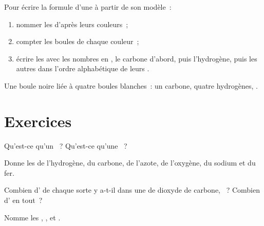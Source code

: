 \begin{method}\label{met:g7:atoms-and-molecules:model}
Pour écrire la formule d'une  à partir de son modèle~:
\begin{enumerate}
  \item nommer les  d'après leurs couleurs~;
  \item compter les boules de chaque couleur~;
  \item écrire les  avec les nombres en , le carbone
        d'abord, puis l'hydrogène, puis les autres  dans l'ordre
        alphabétique de leurs .
\end{enumerate}
Une boule noire liée à quatre boules blanches~: un carbone, quatre
hydrogènes, .
\end{method}

\section{Exercices}

\begin{exercise}[$\star$]\label{exo:g7:atoms-and-molecules:1}
Qu'est-ce qu'un ~? Qu'est-ce qu'une ~?
\end{exercise}

\begin{exercise}[$\star$]\label{exo:g7:atoms-and-molecules:2}
Donne les  de l'hydrogène, du carbone, de l'azote, de
l'oxygène, du sodium et du fer.
\end{exercise}

\begin{exercise}[$\star$]\label{exo:g7:atoms-and-molecules:3}
Combien d' de chaque sorte y a-t-il dans une  de dioxyde
de carbone, ~? Combien d' en tout~?
\end{exercise}

\begin{exercise}[$\star$]\label{exo:g7:atoms-and-molecules:4}
Nomme les  , ,  et .
\end{exercise}

